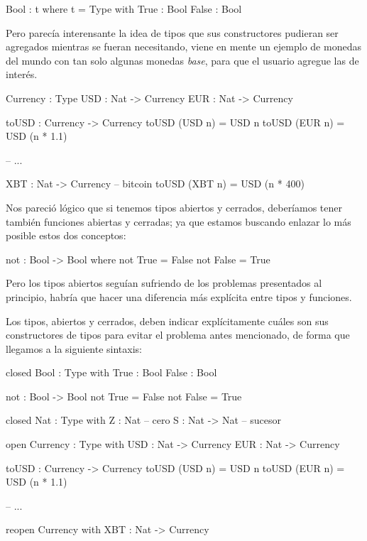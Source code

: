 {\begin{designfr}
\begin{anglercode}
Bool : t where t = Type
    with
        True : Bool
        False : Bool
\end{anglercode}

Pero parecía interensante la idea de tipos que sus constructores pudieran ser agregados mientras se fueran necesitando, viene en mente un ejemplo de monedas del mundo con tan solo algunas monedas \textit{base}, para que el usuario agregue las de interés.

\begin{anglercode}
Currency : Type
USD : Nat -> Currency
EUR : Nat -> Currency

toUSD : Currency -> Currency
toUSD (USD n) = USD n
toUSD (EUR n) = USD (n * 1.1)

-- ...

XBT : Nat -> Currency   -- bitcoin
toUSD (XBT n) = USD (n * 400)
\end{anglercode}

Nos pareció lógico que si tenemos tipos abiertos y cerrados, deberíamos tener también funciones abiertas y cerradas; ya que estamos buscando enlazar lo más posible estos dos conceptos:

\begin{anglercode}
not : Bool -> Bool where
    not True = False
    not False = True
\end{anglercode}

Pero los tipos abiertos seguían sufriendo de los problemas presentados al principio, habría que hacer una diferencia más explícita entre tipos y funciones.

Los tipos, abiertos y cerrados, deben indicar explícitamente cuáles son sus constructores de tipos para evitar el problema antes mencionado, de forma que llegamos a la siguiente sintaxis:

\begin{anglercode}
closed Bool : Type with
    True : Bool
    False : Bool

not : Bool -> Bool
not True = False
not False = True

closed Nat : Type with
    Z : Nat             -- cero
    S : Nat -> Nat      -- sucesor

open Currency : Type with
    USD : Nat -> Currency
    EUR : Nat -> Currency

toUSD : Currency -> Currency
toUSD (USD n) = USD n
toUSD (EUR n) = USD (n * 1.1)

-- ...

reopen Currency with
    XBT : Nat -> Currency


\end{anglercode}
\end{designfr}}

